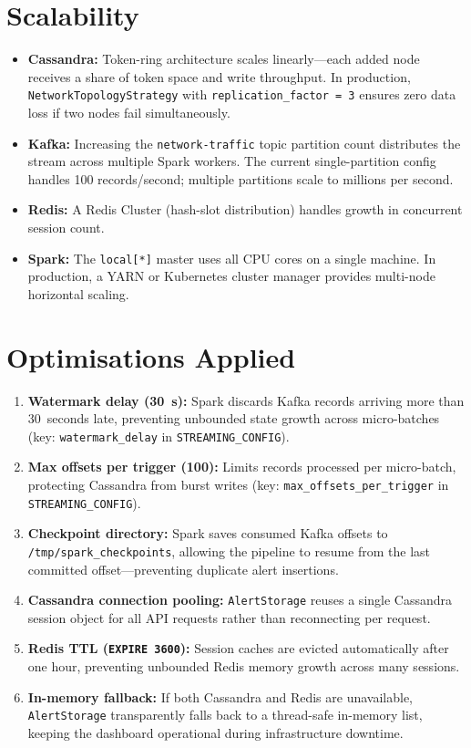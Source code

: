 \documentclass[12pt,a4paper]{report}
\begin{document}
\section{Scalability}
\begin{itemize}
  \item \textbf{Cassandra:}  Token-ring architecture scales linearly---each
        added node receives a share of token space and write throughput.  In
        production, \texttt{NetworkTopologyStrategy} with
        \texttt{replication\_factor~=~3} ensures zero data loss if two nodes
        fail simultaneously.
  \item \textbf{Kafka:}  Increasing the \texttt{network-traffic} topic
        partition count distributes the stream across multiple Spark workers.
        The current single-partition config handles 100 records/second;
        multiple partitions scale to millions per second.
  \item \textbf{Redis:}  A Redis Cluster (hash-slot distribution) handles
        growth in concurrent session count.
  \item \textbf{Spark:}  The \texttt{local[*]} master uses all CPU cores on
        a single machine.  In production, a YARN or Kubernetes cluster manager
        provides multi-node horizontal scaling.
\end{itemize}

\section{Optimisations Applied}
\begin{enumerate}
  \item \textbf{Watermark delay (30~s):}  Spark discards Kafka records
        arriving more than 30~seconds late, preventing unbounded state growth
        across micro-batches (key: \texttt{watermark\_delay} in
        \texttt{STREAMING\_CONFIG}).
  \item \textbf{Max offsets per trigger (100):}  Limits records processed per
        micro-batch, protecting Cassandra from burst writes (key:
        \texttt{max\_offsets\_per\_trigger} in \texttt{STREAMING\_CONFIG}).
  \item \textbf{Checkpoint directory:}  Spark saves consumed Kafka offsets to
        \texttt{/tmp/spark\_checkpoints}, allowing the pipeline to resume from
        the last committed offset---preventing duplicate alert insertions.
  \item \textbf{Cassandra connection pooling:}  \texttt{AlertStorage} reuses
        a single Cassandra session object for all API requests rather than
        reconnecting per request.
  \item \textbf{Redis TTL (\texttt{EXPIRE 3600}):}  Session caches are evicted
        automatically after one hour, preventing unbounded Redis memory growth
        across many sessions.
  \item \textbf{In-memory fallback:}  If both Cassandra and Redis are
        unavailable, \texttt{AlertStorage} transparently falls back to a
        thread-safe in-memory list, keeping the dashboard operational during
        infrastructure downtime.
\end{enumerate}
\end{document}
